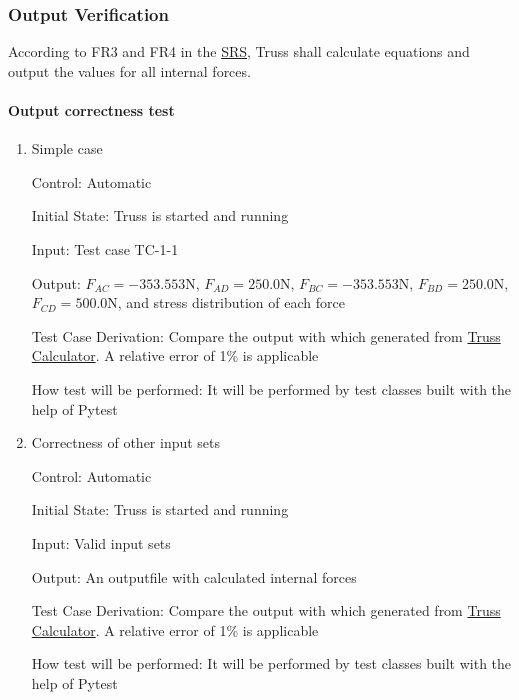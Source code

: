 \documentclass[12pt, titlepage]{article}
\begin{document}
\subsubsection{Output Verification} \label{outverify}
According to FR3 and FR4 in the 
\href{https://github.com/tingyuw/cas741/blob/master/docs/SRS/SRS.pdf}{SRS}, 
Truss shall calculate equations and output the values for all internal forces. 

\paragraph{Output correctness test}

\begin{enumerate}
	
	\item{Simple case\\}
	
	Control: Automatic
	
	Initial State: Truss is started and running
	
	Input: Test case TC-1-1
	
	Output: $F_{AC} = -353.553 \si{\newton}$, $F_{AD} = 250.0 \si{\newton}$, 
	$F_{BC} = -353.553 \si{\newton}$, $F_{BD} = 250.0 \si{\newton}$, $F_{CD} = 
	500.0 \si{\newton}$, and stress distribution of each force
	
	Test Case Derivation: Compare the output with which generated from
	\href{https://skyciv.com/free-truss-calculator/}{Truss Calculator}. A 
	relative error of 1\% is applicable
	
	How test will be performed: It will be performed by test classes built with 
	the help of Pytest
	
	\item{Correctness of other input sets\\}
	
	Control: Automatic
	
	Initial State: Truss is started and running
	
	Input: Valid input sets
	
	Output: An outputfile with calculated internal forces
	
	Test Case Derivation: Compare the output with which generated from
	\href{https://skyciv.com/free-truss-calculator/}{Truss Calculator}. A 
	relative error of 1\% is applicable
	
	How test will be performed: It will be performed by test classes built with 
	the help of Pytest
\end{enumerate}
\end{document}
